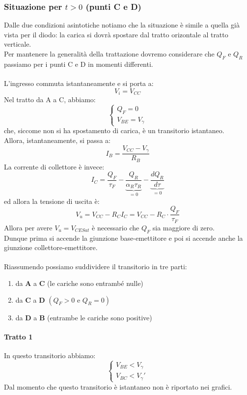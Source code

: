 \documentclass{article}
\numberwithin{equation}{subsection}
\begin{document}
	\subsubsection{Situazione per $t > 0$ (punti C e D)}\label{par:20.3.3}
	Dalle due condizioni asintotiche notiamo che la situazione è simile a quella già vista per il diodo: la carica si dovrà spostare dal tratto orizontale al tratto verticale.\\
	Per mantenere la generalità della trattazione dovremo considerare che $Q_F$ e $Q_R$ passiamo per i punti C e D in momenti differenti.\\\\
	L'ingresso commuta istantaneamente e si porta a:
	\[ V_i = V_{CC} \]
	Nel tratto da A a C, abbiamo:
	\[ \begin{cases} Q_F = 0 \\ V_{BE} = V_\gamma \end{cases} \]
	che, siccome non si ha spostamento di carica, è un transitorio istantaneo.\\
	Allora, istantaneamente, si passa a:
	\[ I_B = \frac{V_{CC} - V_\gamma}{R_B} \]
	La corrente di collettore è invece:
	\[ I_C = \frac{Q_F}{\tau_F} - \underbrace{\frac{Q_R}{\alpha_R \tau_R}}_{=0} - \underbrace{\frac{dQ_R}{d\tau}}_{=0} \]
	ed allora la tensione di uscita è:
	\[ V_u = V_{CC} - R_C I_C = V_{CC} - R_C \cdot \frac{Q_F}{\tau_F} \]
	Allora per avere $V_u = V_{CESat}$ è necessario che $Q_F$ sia maggiore di zero.\\
	Dunque prima si accende la giunzione base-emettitore e poi si accende anche la giunzione collettore-emettitore.\\\\
	Riassumendo possiamo suddividere il transitorio in tre parti:
	\begin{enumerate}
		\item da $\mathbf{A}$ a $\mathbf{C}$ (le cariche sono entrambé nulle)
		\item da \(\mathbf{C}\) a \(\mathbf{D}\) \((Q_{F} > 0\text{ e }Q_{R} = 0)\)
		\item da $\mathbf{D}$ a $\mathbf{B}$ (entrambe le cariche sono positive)
	\end{enumerate}
	\paragraph{Tratto 1}
	In questo transitorio abbiamo:
	\[ \begin{cases} V_{BE} < V_\gamma \\ V_{BC} < V_\gamma' \end{cases} \]
	Dal momento che questo transitorio è istantaneo non è riportato nei grafici.
\end{document}
